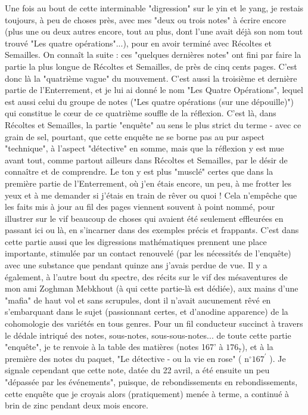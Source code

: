 Une fois au bout de cette interminable "digression" sur le yin et le yang, je restais toujours, à peu de choses près, avec mes "deux ou trois notes" à écrire encore (plus une ou deux autres encore, tout au plus, dont l'une avait déjà son nom tout trouvé "Les quatre opérations"...), pour en avoir terminé avec Récoltes et Semailles. On connaît la suite : ces "quelques dernières notes" ont fini par faire la partie la plus longue de Récoltes et Semailles, de près de cinq cents pages. C'est donc là la "quatrième vague" du mouvement. C'est aussi la troisième et dernière partie de l'Enterrement, et je lui ai donné le nom "Les Quatre Opérations", lequel est aussi celui du groupe de notes ("Les quatre opérations (sur une dépouille)") qui constitue le cœur de ce quatrième souffle de la réflexion. C'est là, dans Récoltes et Semailles, la partie "enquête" au sens le plus strict du terme - avec ce grain de sel, pourtant, que cette enquête ne se borne pas au pur aspect "technique", à l'aspect "détective" en somme, mais que la réflexion y est mue avant tout, comme partout ailleurs dans Récoltes et Semailles, par le désir de connaître et de comprendre. Le ton y est plus "musclé" certes que dans la première partie de l'Enterrement, où j'en étais encore, un peu, à me frotter les yeux et à me demander si j'étais en train de rêver ou quoi ! Cela n'empêche que les faits mis à jour au fil des pages viennent souvent à point nommé, pour illustrer sur le vif beaucoup de choses qui avaient été seulement effleurées en passant ici ou là, en s'incarner dans des exemples précis et frappants. C'est dans cette partie aussi que les digressions mathématiques prennent une place importante, stimulée par un contact renouvelé (par les nécessités de l'enquête) avec une substance que pendant quinze ans j'avais perdue de vue. Il y a également, à l'autre bout du spectre, des récits sur le vif des mésaventures de mon ami Zoghman Mebkhout (à qui cette partie-là est dédiée), aux mains d'une "mafia" de haut vol et sans scrupules, dont il n'avait aucunement rêvé en s'embarquant dans le sujet (passionnant certes, et d'anodine apparence) de la cohomologie des variétés en tous genres. Pour un fil conducteur succinct à travers le dédale intriqué des notes, sous-notes, sous-sous-notes... de toute cette partie "enquête", je te renvoie à la table des matières (notes 167' à $176_{7}$), et à la première des notes du paquet, "Le détective - ou la vie en rose" ( $\mathrm{n}^{\circ} 167^{\prime}$ ). Je signale cependant que cette note, datée du 22 avril, a été ensuite un peu "dépassée par les événements", puisque, de rebondissements en rebondissements, cette enquête que je croyais alors (pratiquement) menée à terme, a continué à brin de zinc pendant deux mois encore.

